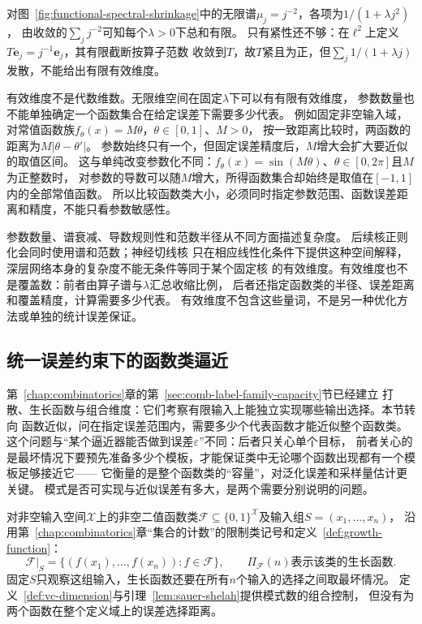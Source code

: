 对图~\ref{fig:functional-spectral-shrinkage}中的无限谱$\mu_j=j^{-2}$，各项为$1/(1+\lambda j^2)$，
由收敛的$\sum_j j^{-2}$可知每个$\lambda>0$下总和有限。
只有紧性还不够：在$\ell^2$上定义$T\bm e_j=j^{-1}\bm e_j$，其有限截断按算子范数
收敛到$T$，故$T$紧且为正，但$\sum_j1/(1+\lambda j)$发散，不能给出有限有效维度。

有效维度不是代数维数。无限维空间在固定$\lambda$下可以有有限有效维度，
参数数量也不能单独确定一个函数集合在给定误差下需要多少代表。
例如固定非空输入域，对常值函数族$f_\theta(x)=M\theta$，$\theta\in[0,1]$、$M>0$，
按一致距离比较时，两函数的距离为$M|\theta-\theta'|$。
参数始终只有一个，但固定误差精度后，$M$增大会扩大要近似的取值区间。
这与单纯改变参数化不同：$f_\theta(x)=\sin(M\theta)$、$\theta\in[0,2\pi]$且$M$为正整数时，
对参数的导数可以随$M$增大，所得函数集合却始终是取值在$[-1,1]$内的全部常值函数。
所以比较函数类大小，必须同时指定参数范围、函数误差距离和精度，不能只看参数敏感性。

参数数量、谱衰减、导数规则性和范数半径从不同方面描述复杂度。
后续核正则化会同时使用谱和范数；神经切线核
只在相应线性化条件下提供这种空间解释，深层网络本身的复杂度不能无条件等同于某个固定核
的有效维度。有效维度也不是覆盖数：前者由算子谱与$\lambda$汇总收缩比例，
后者还指定函数类的半径、误差距离和覆盖精度，计算需要多少代表。
有效维度不包含这些量词，不是另一种优化方法或单独的统计误差保证。

\subsection{统一误差约束下的函数类逼近}
\label{sec:functional-covering-metric-entropy}
\label{sec:functional-combinatorial-metric-complexity}

\label{sec:functional-sequential-classes-low-rank}

第~\ref{chap:combinatorics}章的第~\ref{sec:comb-label-family-capacity}节已经建立
打散、生长函数与组合维度：它们考察有限输入上能独立实现哪些输出选择。本节转向
函数近似，问在指定误差范围内，需要多少个代表函数才能近似整个函数类。
这个问题与“某个逼近器能否做到误差$\varepsilon$”不同：后者只关心单个目标，
前者关心的是最坏情况下要预先准备多少个模板，才能保证类中无论哪个函数出现都有一个模板足够接近它——
它衡量的是整个函数类的“容量”，对泛化误差和采样量估计更关键。
模式是否可实现与近似误差有多大，是两个需要分别说明的问题。

对非空输入空间$\mathcal X$上的非空二值函数类$\mathcal F\subseteq\{0,1\}^{\mathcal X}$及输入组$S=(x_1,\ldots,x_n)$，
沿用第~\ref{chap:combinatorics}章“集合的计数”的限制类记号和定义~\ref{def:growth-function}：
\begin{equation}
 \mathcal F|_S=\{(f(x_1),\ldots,f(x_n)):f\in\mathcal F\},
 \qquad \Pi_{\mathcal F}(n)\text{表示该类的生长函数}.
 \label{eq:functional-growth-function}
\end{equation}
固定$S$只观察这组输入，生长函数还要在所有$n$个输入的选择之间取最坏情况。
定义~\ref{def:vc-dimension}与引理~\ref{lem:sauer-shelah}提供模式数的组合控制，
但没有为两个函数在整个定义域上的误差选择距离。

